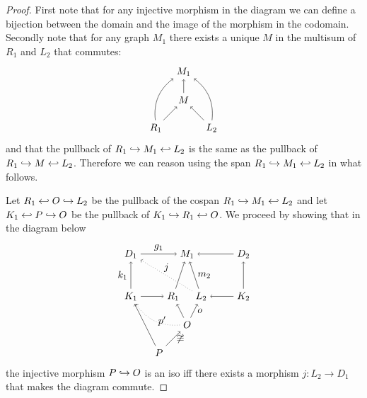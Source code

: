 \begin{proof}
  First note that for any injective morphism in the diagram we can define a bijection between the domain and the image of the morphism in the codomain. Secondly note that for any graph $M_1$ there exists a unique $M$ in the multisum of $R_1$ and $L_2$ that commutes:
  \[
  \begin{tikzpicture} %
    \node (r1) at (1,0) {\(R_1\)};
    \node (m1) at (2,2) {\(M_1\)};
    \node (m) at (2,1) {\(M\)};
    \node (l2) at (3,0) {\(L_2\)};
    \draw [->] (r1) -- (m);
    \draw [->] (l2) -- (m);
    \draw [->] (m) -- (m1);
    \draw [->] (r1) to [bend left] (m1);
    \draw [->] (l2) to [bend right] (m1);
    \end{tikzpicture}
    \]
    and that the pullback of $R_1\hookrightarrow M_1\hookleftarrow L_2$ is the same as the pullback of $R_1\hookrightarrow M\hookleftarrow L_2$. Therefore we can reason using the span $R_1\hookrightarrow M_1\hookleftarrow L_2$ in what follows.

    Let $R_1\hookleftarrow O \hookrightarrow L_2$ be the pullback of the cospan $R_1\hookrightarrow M_1\hookleftarrow L_2$ and let $K_1\hookleftarrow P \hookrightarrow O$ be the pullback of $K_1\hookrightarrow R_1\hookleftarrow O$.
  We proceed by showing that in the diagram below
    \[
    \begin{tikzpicture} %
    \node (r1) at (1.5,0) {\(R_1\)};
    \node (m1) at (2,1.5) {\(M_1\)};
    \node (l2) at (2.5,0) {\(L_2\)};
    \node (d1) at (0,1.5) {\(D_1\)};
    \node (k1) at (0,0) {\(K_1\)};
    \node (d2) at (4,1.5) {\(D_2\)};
    \node (k2) at (4,0) {\(K_2\)};
    \node (o) at (2,-1) {\(O\)};
    \node (p) at (1,-2) {\(P\)};
    \draw [->] (k1) -- (r1);
    \draw [->] (k2) -- (l2);
    \draw [->] (k1) -- node [left,midway] {\(k_1\)} (d1);
    \draw [->] (k2) -- (d2);
    \draw [->] (d1) -- node [above,midway] {\(g_1\)} (m1);
    \draw [->] (d2) -- (m1);
    \draw [->] (l2) -- node [right,midway] {\(m_2\)} (m1);
    \draw [->] (r1) -- (m1);
    \draw [dotted,->] (l2) -- node [above,midway] {\(j\)} (d1);
    \draw [->] (p) -- (k1);
    \draw [->] (p) -- node [right,midway] {$\not\iso$} (o);
    \draw [->] (o) -- (r1);
    \draw [->] (o) -- node [right,midway] {$o$} (l2);
    \draw [dotted,->] (o) to [bend left] node [right,midway] {$p'$} (k1);
    \end{tikzpicture}
    \]
    the injective morphism $P\hookrightarrow O$ is an iso iff there exists a morphism $j:L_2\to D_1$ that makes the diagram commute.


\end{proof}
